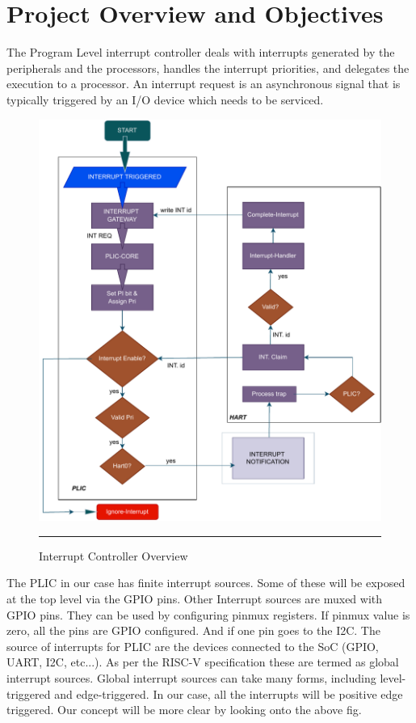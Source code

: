 
\chapter{Project Overview and Objectives}
\label{Chapter4}

The Program Level interrupt controller deals with interrupts generated by the peripherals and the processors, handles the interrupt priorities, and delegates the execution to a processor. An interrupt request is an asynchronous signal that is typically triggered by an I/O 
device which needs to be serviced. 


\begin{figure}[htbp]
	\centering
		\includegraphics[width = 1\textwidth]{./shaheer_figures/fig_1.pdf}
		\rule{35em}{2pt}
	\caption{Interrupt Controller Overview}
	\label{fig:Structure of INT. controller}
\end{figure}

The PLIC in our case has finite interrupt sources. Some of these will be exposed at the top level via the GPIO pins. Other Interrupt sources are muxed with GPIO pins. They can be used by configuring pinmux registers. If pinmux value is zero, all the pins are GPIO configured. And if one pin goes to the I2C. The source of interrupts for PLIC are the devices connected to the SoC (GPIO, UART, I2C, etc...). As per the RISC-V specification these are termed as global interrupt sources. Global interrupt sources can take many forms, including level-triggered and edge-triggered. In our case, all the interrupts will be positive edge triggered. Our concept will be more clear by looking onto the above fig.

